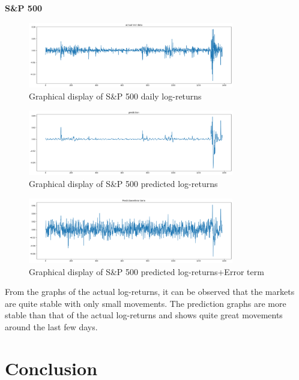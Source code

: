 \documentclass[a4paper,11pt,oneside]{book}
\begin{document}
\textbf{S\&P 500}

\begin{figure}[!h]
	\centering
	\includegraphics[width=0.8\textwidth]{figures/sanptest}
	\caption{Graphical display of S\&P 500 daily log-returns}
	\label{sanptest}
\end{figure}

\begin{figure}[!h]
	\centering
	\includegraphics[width=0.8\textwidth]{figures/sanppred}
	\caption{Graphical display of S\&P 500 predicted log-returns}
	\label{sanpred}
\end{figure}


\begin{figure}[!h]
	\centering
	\includegraphics[width=0.8\textwidth]{figures/sanperror}
	\caption{Graphical display of S\&P 500 predicted log-returns+Error term}
	\label{sanpERROR}
\end{figure}
	From the graphs of the actual log-returns, it can be observed that the markets are quite stable with only small movements. The prediction graphs are more stable than that of the actual log-returns and shows quite great movements around the last few days.
	



\chapter{Conclusion}
\end{document}
